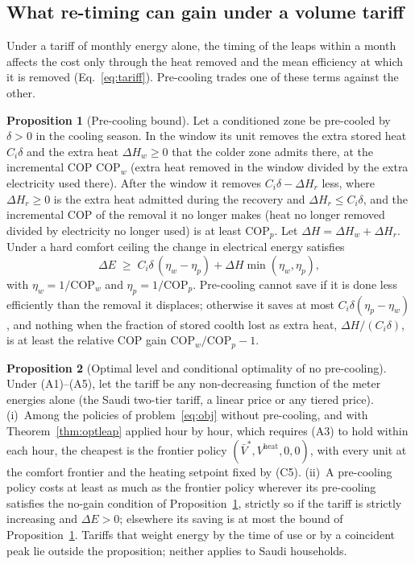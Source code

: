 \documentclass[10pt,a4paper,twocolumn]{article}
\theoremstyle{definition}
\newtheorem{proposition}{Proposition}
\begin{document}
\subsection{What re-timing can gain under a volume tariff}\label{sec:retiming}\label{lem:inert}
Under a tariff of monthly energy alone, the timing of the leaps within a month affects the cost only through the heat removed and the mean efficiency at which it is removed (Eq.~\eqref{eq:tariff}). Pre-cooling trades one of these terms against the other.

\begin{proposition}[Pre-cooling bound]\label{obs:precool}
Let a conditioned zone be pre-cooled by $\delta>0$ in the cooling season. In the window its unit removes the extra stored heat $C_i\delta$ and the extra heat $\Delta H_w\ge0$ that the colder zone admits there, at the incremental COP $\mathrm{COP}_w$ (extra heat removed in the window divided by the extra electricity used there). After the window it removes $C_i\delta-\Delta H_r$ less, where $\Delta H_r\ge0$ is the extra heat admitted during the recovery and $\Delta H_r\le C_i\delta$, and the incremental COP of the removal it no longer makes (heat no longer removed divided by electricity no longer used) is at least $\mathrm{COP}_p$. Let $\Delta H=\Delta H_w+\Delta H_r$. Under a hard comfort ceiling the change in electrical energy satisfies
\begin{equation}\label{eq:precoolbound}
\Delta E\;\ge\;C_i\delta\,(\eta_w-\eta_p)+\Delta H\min(\eta_w,\eta_p),
\end{equation}
with $\eta_w=1/\mathrm{COP}_w$ and $\eta_p=1/\mathrm{COP}_p$. Pre-cooling cannot save if it is done less efficiently than the removal it displaces; otherwise it saves at most $C_i\delta(\eta_p-\eta_w)$, and nothing when the fraction of stored coolth lost as extra heat, $\Delta H/(C_i\delta)$, is at least the relative COP gain $\mathrm{COP}_w/\mathrm{COP}_p-1$.
\end{proposition}

\begin{proposition}[Optimal level and conditional optimality of no pre-cooling]\label{thm:policy}
Under (A1)--(A5), let the tariff be any non-decreasing function of the meter energies alone (the Saudi two-tier tariff, a linear price or any tiered price). (i)~Among the policies of problem~\eqref{eq:obj} without pre-cooling, and with Theorem~\ref{thm:optleap} applied hour by hour, which requires (A3) to hold within each hour, the cheapest is the frontier policy $(\bar V^\ast,V^{\text{heat}},0,0)$, with every unit at the comfort frontier and the heating setpoint fixed by (C5). (ii)~A pre-cooling policy costs at least as much as the frontier policy wherever its pre-cooling satisfies the no-gain condition of Proposition~\ref{obs:precool}, strictly so if the tariff is strictly increasing and $\Delta E>0$; elsewhere its saving is at most the bound of Proposition~\ref{obs:precool}. Tariffs that weight energy by the time of use or by a coincident peak lie outside the proposition; neither applies to Saudi households.
\end{proposition}
\end{document}

